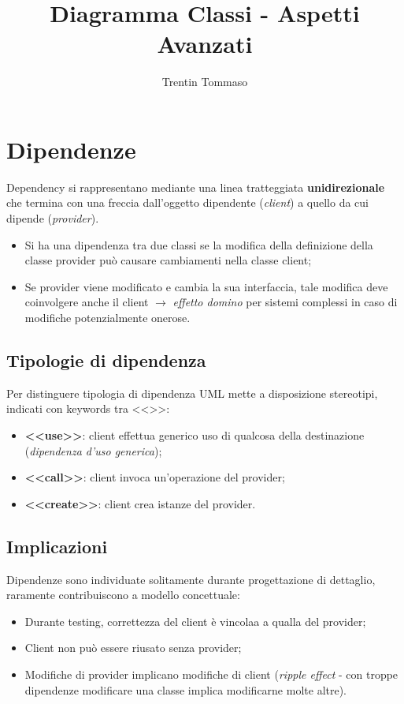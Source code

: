 \documentclass{article}
\title{Diagramma Classi - Aspetti Avanzati}
\author{Trentin Tommaso}
\begin{document}
  \maketitle
  \tableofcontents
  \newpage

  \section{Dipendenze}
    Dependency si rappresentano mediante una linea tratteggiata \textbf{unidirezionale} che termina con una freccia dall'oggetto dipendente (\textit{client}) a quello da cui dipende (\textit{provider}).
    \begin{itemize}
      \item Si ha una dipendenza tra due classi se la modifica della definizione della classe provider può causare cambiamenti nella classe client; 
      \item Se provider viene modificato e cambia la sua interfaccia, tale modifica deve coinvolgere anche il client $\rightarrow$ \textit{effetto domino} per sistemi complessi in caso di modifiche potenzialmente onerose. 
    \end{itemize}
    \subsection{Tipologie di dipendenza}
      Per distinguere tipologia di dipendenza UML mette a disposizione stereotipi, indicati con keywords tra <<>>:
      \begin{itemize}
        \item \textbf{<<use>>}: client effettua generico uso di qualcosa della destinazione (\textit{dipendenza d'uso generica});
        \item \textbf{<<call>>}: client invoca un'operazione del provider;
        \item \textbf{<<create>>}: client crea istanze del provider.
      \end{itemize}
    \subsection{Implicazioni}
      Dipendenze sono individuate solitamente durante progettazione di dettaglio, raramente contribuiscono a modello concettuale:
      \begin{itemize}
        \item Durante testing, correttezza del client è vincolaa a qualla del provider; 
        \item Client non può essere riusato senza provider; 
        \item Modifiche di provider implicano modifiche di client (\textit{ripple effect} - con troppe dipendenze modificare una classe implica modificarne molte altre).
      \end{itemize}
\end{document}

